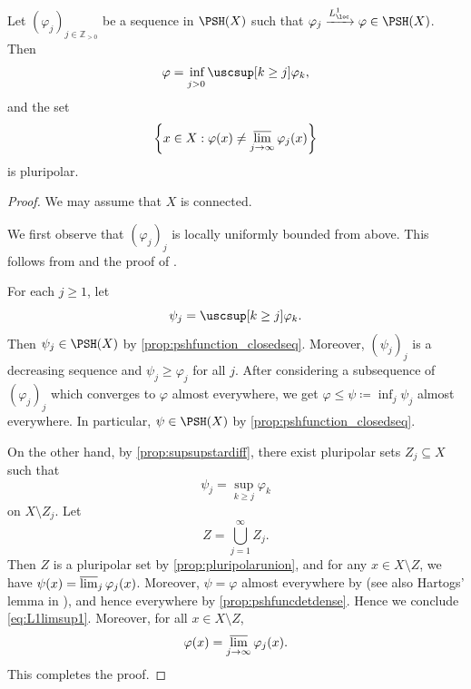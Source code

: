 \begin{corollary}\label{cor:L1limipp}
    Let $(\varphi_j)_{j\in \mathbb{Z}_{>0}}$ be a sequence in $\PSH(X)$ such that $\varphi_j\xrightarrow{L^1_{\loc}}\varphi\in \PSH(X)$. Then
    \begin{equation}\label{eq:L1limsup1}
        \varphi=\mathop{\vphantom{\operatorname{sup}^{*}}\inf}\limits_{j>0} \uscsup[k\geq j]\varphi_k,
    \end{equation} and the set
    \[
        \left\{x\in X: \varphi(x)\neq \varlimsup_{j\to\infty}\varphi_j(x)\right\}
    \]
    is pluripolar.
\end{corollary}
\begin{proof}
    We may assume that $X$ is connected.

    We first observe that $(\varphi_j)_j$ is locally uniformly bounded from above. This follows from \cite[Exercise~1.20]{GZ17} and the proof of \cite[Theorem~8.3.7]{FPT}.

    For each $j\geq 1$, let
    \[
        \psi_j=\uscsup[k\geq j]\varphi_k.
    \]
    Then $\psi_j\in \PSH(X)$ by \cref{prop:pshfunction_closedseq}. Moreover, $(\psi_j)_j$ is a decreasing sequence and $\psi_j\geq \varphi_j$ for all $j$.
    After considering a subsequence of $(\varphi_j)_j$ which converges to $\varphi$ almost everywhere, we get $\varphi\leq \psi\coloneqq \inf_j \psi_j$ almost everywhere. In particular, $\psi\in \PSH(X)$ by \cref{prop:pshfunction_closedseq}.

    On the other hand, by \cref{prop:supsupstardiff}, there exist pluripolar sets $Z_j\subseteq X$ such that
    \[
    \psi_j=\sup_{k\geq j}\varphi_k
    \]
    on $X\setminus Z_j$. Let
    \[
    Z=\bigcup_{j=1}^{\infty} Z_j.
    \]
    Then $Z$ is a pluripolar set by \cref{prop:pluripolarunion}, and for any $x\in X\setminus Z$, we have $\psi(x)=\varlimsup_j \varphi_j(x)$.
    Moreover, $\psi=\varphi$ almost everywhere by \cite[Theorem~1.46]{GZ17} (see also Hartogs' lemma in \cite[Theorem~8.3.4]{FPT}), and hence everywhere by \cref{prop:pshfuncdetdense}. Hence we conclude \eqref{eq:L1limsup1}.
    Moreover, for all $x\in X\setminus Z$,
    \[
        \varphi(x)=\varlimsup_{j\to\infty}  \varphi_j(x).
    \]
    This completes the proof.
\end{proof}


